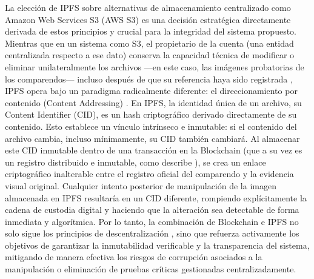 La elección de IPFS sobre alternativas de almacenamiento centralizado como Amazon Web Services S3 (AWS S3) es una decisión estratégica directamente derivada de estos principios y crucial para la integridad del sistema propuesto.
Mientras que en un sistema como S3, el propietario de la cuenta (una entidad centralizada respecto a ese dato) conserva la capacidad técnica de modificar o eliminar unilateralmente los archivos —en este caso, las imágenes probatorias de los comparendos— incluso después de que su referencia haya sido registrada \parencite{vogels2008eventually}, IPFS opera bajo un paradigma radicalmente diferente: el direccionamiento por contenido (Content Addressing) \parencite{benet2014ipfs}. En IPFS, la identidad única de un archivo, su Content Identifier (CID), es un hash criptográfico derivado directamente de su contenido.
Esto establece un vínculo intrínseco e inmutable: si el contenido del archivo cambia, incluso mínimamente, su CID también cambiará. Al almacenar este CID inmutable dentro de una transacción en la Blockchain (que a su vez es un registro distribuido e inmutable, como describe \parencite{nakamoto2008bitcoin}), se crea un enlace criptográfico inalterable entre el registro oficial del comparendo y la evidencia visual original.
Cualquier intento posterior de manipulación de la imagen almacenada en IPFS resultaría en un CID diferente, rompiendo explícitamente la cadena de custodia digital y haciendo que la alteración sea detectable de forma inmediata y algorítmica. Por lo tanto, la combinación de Blockchain e IPFS no solo sigue los principios de descentralización \parencite{vanSteen2017}, sino que refuerza activamente los objetivos de garantizar la inmutabilidad verificable y la transparencia del sistema, mitigando de manera efectiva los riesgos de corrupción asociados a la manipulación o eliminación de pruebas críticas gestionadas centralizadamente. 


